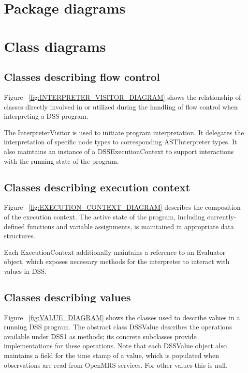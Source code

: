 \documentclass[12pt,letterpaper]{article}
\begin{document}
{%

\newpage 
\section{Package diagrams}

\newpage 
\section{Class diagrams} \label{sec:CLASS_DIAGRAMS}

\subsection{Classes describing flow control}

Figure ~\ref{fig:INTERPRETER_VISITOR_DIAGRAM} shows the relationship 
of classes directly involved in or utilized during the handling of flow 
control when interpreting a DSS program.

The InterpreterVisitor is used to initiate program interpretation. It 
delegates the interpretation of specific node types to corresponding 
ASTInterpreter types. It also maintains an instance of a DSSExecutionContext 
to support interactions with the running state of the program.

\subsection{Classes describing execution context}

Figure ~\ref{fig:EXECUTION_CONTEXT_DIAGRAM} describes the 
composition of the execution context. The active state of the program, 
including currently-defined functions and variable assignments, is maintained in appropriate data structures.

Each ExecutionContext additionally maintains a reference to an Evaluator 
object, which exposes necessary methods for the interpreter to interact 
with values in DSS.

\subsection{Classes describing values}

Figure ~\ref{fig:VALUE_DIAGRAM} shows the classes used to describe values in 
a running DSS program. The abstract class DSSValue describes the operations 
available under DSS1 as methods; its concrete subclasses provide 
implementations for these operations. Note that each DSSValue object also 
maintains a field for the time stamp of a value, which is populated when 
observations are read from OpenMRS services. For other values this is null.

}
\end{document}
